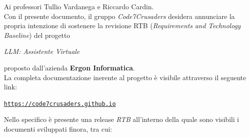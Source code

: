 \documentclass{article}
\begin{document}
Ai professori Tullio Vardanega e Riccardo Cardin.\\
Con il presente documento, il gruppo \textit{Code7Crusaders} desidera annunciare la propria intenzione di sostenere
la revisione RTB (\textit{Requirements and Technology Baseline}) del progetto
\begin{center}
    \textit{LLM: Assistente Virtuale}
\end{center}
proposto dall'azienda \textbf{Ergon Informatica}.\\
La completa documentazione inerente al progetto è visibile attraverso il seguente link:
\begin{center}
    \texttt{\url{https://code7crusaders.github.io}}
\end{center}
Nello specifico è presente una release \textit{RTB} all'interno della quale sono visibili i documenti sviluppati finora, tra cui:
\end{document}
